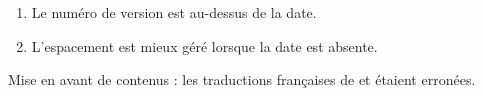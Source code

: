 \documentclass[12pt, a4paper]{article}
\begin{document}
\begin{tdocupdate}
	\item {}
    \begin{enumerate}
		\item Le numéro de version est au-dessus de la date.

		\item L'espacement est mieux géré lorsque la date est absente.
    \end{enumerate}
\end{tdocupdate}


\begin{tdocfix}
	\item Mise en avant de contenus : les traductions françaises de  et  étaient erronées.
\end{tdocfix}
\end{document}
